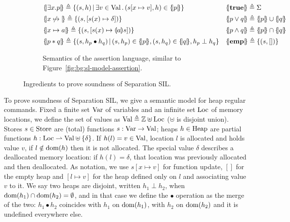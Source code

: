 \begin{figure}[t]
\begin{subfigure}[t]{\linewidth}
\begin{align*}
			 & \asldenot{\exists x. p} \eqdef \{ (s, h) \svert \exists v \in \Val \sdot (s[x \mapsto v], h) \in \asldenot{p} \}                   &  & \asldenot{\true} \eqdef \Sigma                             \\
			 & \asldenot{x \dealloc} \eqdef \{ (s, [s(x) \mapsto \delta]) \}                                                                      &  & \asldenot{p \lor q} \eqdef \asldenot{p} \cup \asldenot{q}  \\
			 & \asldenot{x \mapsto a} \eqdef \{ (s, [s(x) \mapsto \edenot{a} s]) \}                                                               &  & \asldenot{p \land q} \eqdef \asldenot{p} \cap \asldenot{q} \\
			 & \asldenot{p \andsep q} \eqdef \{ (s, h_p \bullet h_q) \svert (s, h_p) \in \asldenot{p}, (s,h_q) \in \asldenot{q}, h_p \perp h_q \} &  & \asldenot{\emp} \eqdef \{ (s, []) \}
		\end{align*}
		\caption{Semantics of the assertion language, similar to Figure~\ref{fig:bg:sl-model-assertion}.}
		\label{fig:sil:ssil-model-assertions}
	\end{subfigure}
	\caption{Ingredients to prove soundness of Separation SIL.}
\end{figure}

To prove soundness of Separation SIL, we give a semantic model for heap regular commands.
Fixed a finite set $\text{Var}$ of variables and an infinite set $\text{Loc}$ of memory locations, we define the set of values as $\text{Val} \triangleq \mathbb{Z} \uplus \text{Loc}$ ($\uplus$ is disjoint union).
Stores $s \in \text{Store}$ are (total) functions $s: \text{Var} \rightarrow \text{Val}$; heaps $h \in \text{Heap}$ are partial functions $h: \text{Loc} \rightharpoonup \text{Val} \uplus \{ \delta \}$. If $h(l) = v \in \text{Val}$, location $l$ is allocated and holds value $v$, if $l \notin \text{dom}(h)$ then it is not allocated. The special value $\delta$ describes a deallocated memory location: if $h(l) = \delta$, that location was previously allocated and then deallocated.
As notation, we use $s[x \mapsto v]$ for function update, $[]$ for the empty heap and $[l \mapsto v]$ for the heap defined only on $l$ and associating value $v$ to it.
We say two heaps are disjoint, written $h_1 \perp h_2$, when $\text{dom}(h_1) \cap \text{dom}(h_2) = \emptyset$, and in that case we define the $\bullet$ operation as the merge of the two: $h_1 \bullet h_2$ coincides with $h_1$ on $\text{dom}(h_1)$, with $h_2$ on $\text{dom}(h_2)$ and it is undefined everywhere else.

